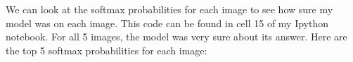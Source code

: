 \documentclass[12pt]{article}
\begin{document}
We can look at the softmax probabilities for each image to see how sure my model was on each image. This code can be found in cell 15 of my Ipython notebook. For all 5 images, the model was very sure about its answer. Here are the top 5 softmax probabilities for each image:

\begin{figure}[!h]
 \\
\end{figure}
\end{document}
